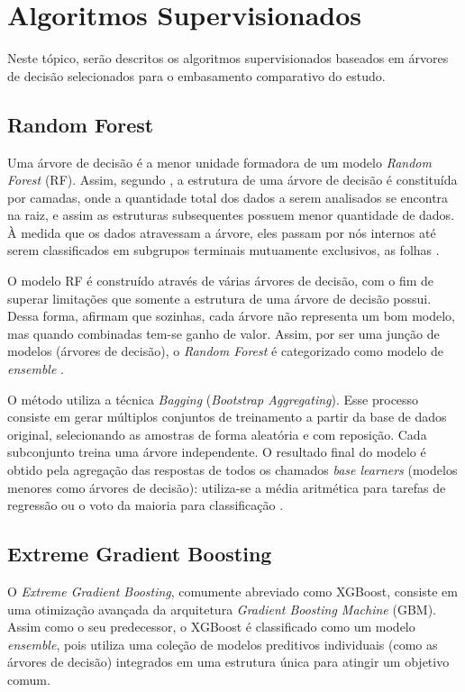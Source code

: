 \documentclass{uflamon}          %
\begin{document}
\section{Algoritmos Supervisionados}

Neste tópico, serão descritos os algoritmos supervisionados baseados em árvores de decisão selecionados para o embasamento comparativo do estudo.

\subsection{Random Forest}

Uma árvore de decisão é a menor unidade formadora de um modelo \textit{Random Forest} (RF). Assim, segundo , a estrutura de uma árvore de decisão é constituída por camadas, onde a quantidade total dos dados a serem analisados se encontra na raiz, e assim as estruturas subsequentes possuem menor quantidade de dados. À medida que os dados atravessam a árvore, eles passam por nós internos até serem classificados em subgrupos terminais mutuamente exclusivos, as folhas \cite{west2016}. 

O modelo RF é construído através de várias árvores de decisão, com o fim de superar limitações que somente a estrutura de uma árvore de decisão possui. Dessa forma,  afirmam que sozinhas, cada árvore não representa um bom modelo, mas quando combinadas tem-se ganho de valor. Assim, por ser uma junção de modelos (árvores de decisão), o \textit{Random Forest} é categorizado como modelo de \textit{ensemble} \cite{salman2024}.

O método utiliza a técnica \textit{Bagging} (\textit{Bootstrap Aggregating}). Esse processo consiste em gerar múltiplos conjuntos de treinamento a partir da base de dados original, selecionando as amostras de forma aleatória e com reposição. Cada subconjunto treina uma árvore independente. O resultado final do modelo é obtido pela agregação das respostas de todos os chamados \textit{base learners} (modelos menores como árvores de decisão): utiliza-se a média aritmética para tarefas de regressão ou o voto da maioria para classificação \cite{salman2024}.

\subsection{Extreme Gradient Boosting}

O \textit{Extreme Gradient Boosting}, comumente abreviado como XGBoost, consiste em uma otimização avançada da arquitetura \textit{Gradient Boosting Machine} (GBM). Assim como o seu predecessor, o XGBoost é classificado como um modelo \textit{ensemble}, pois utiliza uma coleção de modelos preditivos individuais (como as árvores de decisão) integrados em uma estrutura única para atingir um objetivo comum.
\end{document}
